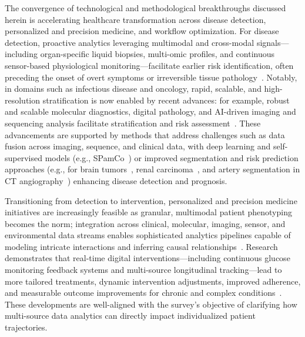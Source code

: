 \documentclass[sigconf]{acmart}
\begin{document}
The convergence of technological and methodological breakthroughs discussed herein is accelerating healthcare transformation across disease detection, personalized and precision medicine, and workflow optimization. For disease detection, proactive analytics leveraging multimodal and cross-modal signals—including organ-specific liquid biopsies, multi-omic profiles, and continuous sensor-based physiological monitoring—facilitate earlier risk identification, often preceding the onset of overt symptoms or irreversible tissue pathology~\cite{ref21,ref51,ref63,ref82,ref94}. Notably, in domains such as infectious disease and oncology, rapid, scalable, and high-resolution stratification is now enabled by recent advances: for example, robust and scalable molecular diagnostics, digital pathology, and AI-driven imaging and sequencing analysis facilitate stratification and risk assessment~\cite{ref18,ref25,ref41,ref51,ref52,ref53,ref62,ref63,ref66,ref67,ref105}. These advancements are supported by methods that address challenges such as data fusion across imaging, sequence, and clinical data, with deep learning and self-supervised models (e.g., SPamCo~\cite{ref105}) or improved segmentation and risk prediction approaches (e.g., for brain tumors~\cite{ref52}, renal carcinoma~\cite{ref53}, and artery segmentation in CT angiography~\cite{ref100}) enhancing disease detection and prognosis.

Transitioning from detection to intervention, personalized and precision medicine initiatives are increasingly feasible as granular, multimodal patient phenotyping becomes the norm; integration across clinical, molecular, imaging, sensor, and environmental data streams enables sophisticated analytics pipelines capable of modeling intricate interactions and inferring causal relationships~\cite{ref28,ref29,ref31,ref33,ref35,ref38,ref49,ref54,ref60,ref63,ref65,ref94,ref104}. Research demonstrates that real-time digital interventions—including continuous glucose monitoring feedback systems and multi-source longitudinal tracking—lead to more tailored treatments, dynamic intervention adjustments, improved adherence, and measurable outcome improvements for chronic and complex conditions~\cite{ref27,ref90,ref95,ref101}. These developments are well-aligned with the survey's objective of clarifying how multi-source data analytics can directly impact individualized patient trajectories.
\end{document}

